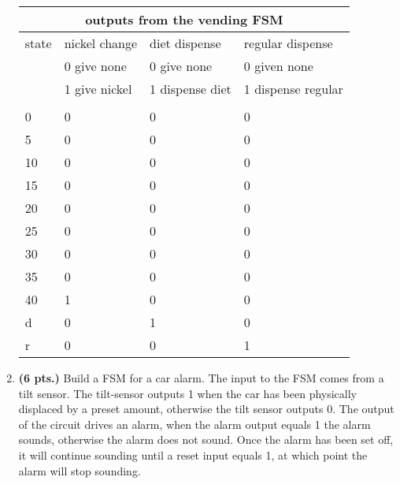 \begin{enumerate}
\begin{onlysolution}
{                \begin{tabular}{|l||l|l|l|} \hline
                    \multicolumn{4}{|c|}{outputs from the vending FSM}                      \\ \hline \hline
                    state   & nickel change     & diet dispense     & regular dispense      \\ \hline
                    & 0 give none       & 0 give none       & 0 given none          \\ \hline
                    & 1 give nickel     & 1 dispense diet   & 1 dispense regular    \\ \hline
                    &                   &                   &                       \\ \hline
                    0       & 0                 & 0                 & 0                     \\ \hline
                    5       & 0                 & 0                 & 0                     \\ \hline
                    10      & 0                 & 0                 & 0                     \\ \hline
                    15      & 0                 & 0                 & 0                     \\ \hline
                    20      & 0                 & 0                 & 0                     \\ \hline
                    25      & 0                 & 0                 & 0                     \\ \hline
                    30      & 0                 & 0                 & 0                     \\ \hline
                    35      & 0                 & 0                 & 0                     \\ \hline
                    40      & 1                 & 0                 & 0                     \\ \hline
                    d       & 0                 & 1                 & 0                     \\ \hline
                    r       & 0                 & 0                 & 1                     \\ \hline
                \end{tabular}
            }
        \end{onlysolution}

    \item \textbf{ (6 pts.)}
        Build a FSM for a car alarm.  The input to the FSM
        comes from a tilt sensor.  The tilt-sensor outputs 1 when the
        car has been physically displaced by a preset amount, otherwise the
        tilt sensor outputs 0.  The output of the circuit drives an alarm,
        when the alarm output equals 1 the alarm sounds, otherwise the alarm
        does not sound.  Once the alarm has been set off, it will continue
        sounding until a reset input equals 1, at which point the alarm will
        stop sounding.


\end{enumerate}
